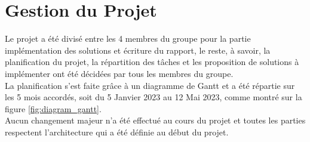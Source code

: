 



\pagestyle{plain}
\chapter{Gestion du Projet}

Le projet a été divisé entre les 4 membres du groupe pour la partie implémentation des solutions et écriture du rapport, le reste, à savoir, la planification du projet, la répartition des tâches et les proposition de solutions à implémenter ont été décidées par tous les membres du groupe.\\
La planification s'est faite grâce à un diagramme de Gantt et a été répartie sur les 5 mois accordés, soit du 5 Janvier 2023 au 12 Mai 2023, comme montré sur la figure \ref{fig:diagram_gantt}.\\
Aucun changement majeur n'a été effectué au cours du projet et toutes les parties respectent l'architecture qui a été définie au début du projet.


